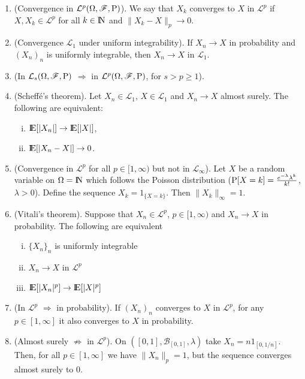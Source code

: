 \documentclass[a4paper,10pt]{article}
\begin{document}
\begin{enumerate}        
 \item (Convergence in $\mathcal{L}^p(\Omega,\mathscr{F},\mathrm{P})$). We say that $X_k$ converges to $X$ in $\mathcal{L}^p$ 
       if $X,X_k\in\mathcal{L}^p$ for all $k\in\N$ and $\|X_k-X\|_p\to 0$.
 \item (Convergence $\mathcal{L}_1$ under uniform integrability). If $X_n \to X$ in probability and $(X_n)_n$ is uniformly
       integrable, then $X_n\to X$ in $\mathcal{L}_1$.
 \item (In $\mathcal{L}_s(\Omega,\mathscr{F},\mathrm{P})$ $\Rightarrow$ in $\mathcal{L}^p(\Omega,\mathscr{F},\mathrm{P})$, for $s>p\geq 1$). 
 \item (Scheff\'e's theorem). Let $X_n\in\mathcal{L}_1$, $X\in\mathcal{L}_1$ and $X_n\to X$ almost surely. The following are 
       equivalent:
       \begin{enumerate}[i.]
        \item $\E[|X_n|] \to \E[|X|]$,
        \item $\E[|X_n - X|]\to  0$.
       \end{enumerate} 
 \item (Convergence in $\mathcal{L}^p$ for all $p\in[1,\infty)$ but not in $\mathcal{L}_\infty$).
       Let $X$ be a random variable on $\Omega=\N$ which follows the Poisson distribution ($\mathrm{P}[X=k]=\frac{e^{-\lambda}\lambda^k}{k!}$, $\lambda>0$).
       Define the sequence $X_k = 1_{\{X=k\}}$. Then $\|X_k\|_\infty=1$.
 \item (Vitali's theorem).
       Suppose that $X_n\in\mathcal{L}^p$, $p\in[1,\infty)$ and $X_n\to X$ in probability.
       The following are equivalent
       \begin{enumerate}[i.]
        \item $\{X_n\}_n$ is uniformly integrable
        \item $X_n\to X$ in $\mathcal{L}^p$
        \item $\E[|X_n|^p] \to \E[|X|^p]$
       \end{enumerate}

 \item (In $\mathcal{L}^p$ $\Rightarrow$ in probability). If $(X_n)_n$ converges to $X$ in $\mathcal{L}^p$, for 
       any $p\in [1,\infty]$ it also converges to $X$ in probability. 
       
 \item (Almost surely $\not\Rightarrow$ in $\mathcal{L}^p$). On $([0,1], \mathcal{B}_{[0,1]}, \lambda)$ take $X_n=n 1_{[0,1/n]}$.
       Then, for all $p\in[1,\infty]$ we have $\|X_n\|_p=1$, but the sequence converges almost surely to $0$.
       

\end{enumerate}
\end{document}

